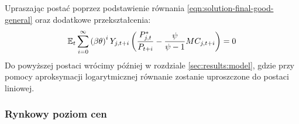 Upraszając postać poprzez podstawienie równania \eqref{eqn:solution-final-good-general} oraz dodatkowe przekształcenia:
\begin{equation}
    \label{eq:price_level_final_company}
    \mathbb{E}_t \sum_{i=0}^{\infty}\left( \beta \theta \right)^i Y_{j,t+i} \left( \frac{P^*_{j,t}}{P_{t+i}} - \frac{\psi}{\psi - 1} MC_{j,t+i}\right) = 0
\end{equation}
Do powyższej postaci wrócimy później w rozdziale \ref{sec:results:model}, gdzie przy pomocy aproksymacji logarytmicznej równanie zostanie uproszczone do postaci liniowej.

\subsubsection{Rynkowy poziom cen}

